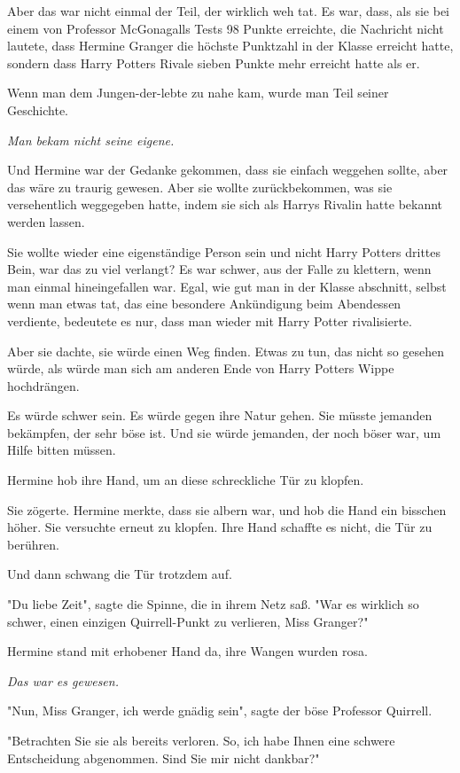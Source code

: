 {Aber das war nicht einmal der Teil, der wirklich weh tat. Es war, dass, als sie bei einem von Professor McGonagalls Tests 98 Punkte erreichte, die Nachricht nicht lautete, dass Hermine Granger die höchste Punktzahl in der Klasse erreicht hatte, sondern dass Harry Potters Rivale sieben Punkte mehr erreicht hatte als er.

Wenn man dem Jungen-der-lebte zu nahe kam, wurde man Teil seiner Geschichte.

\emph{Man bekam nicht seine eigene.}

Und Hermine war der Gedanke gekommen, dass sie einfach weggehen sollte, aber das wäre zu traurig gewesen. Aber sie wollte zurückbekommen, was sie versehentlich weggegeben hatte, indem sie sich als Harrys Rivalin hatte bekannt werden lassen.

Sie wollte wieder eine eigenständige Person sein und nicht Harry Potters drittes Bein, war das zu viel verlangt? Es war schwer, aus der Falle zu klettern, wenn man einmal hineingefallen war. Egal, wie gut man in der Klasse abschnitt, selbst wenn man etwas tat, das eine besondere Ankündigung beim Abendessen verdiente, bedeutete es nur, dass man wieder mit Harry Potter rivalisierte.

Aber sie dachte, sie würde einen Weg finden. Etwas zu tun, das nicht so gesehen würde, als würde man sich am anderen Ende von Harry Potters Wippe hochdrängen.

Es würde schwer sein. Es würde gegen ihre Natur gehen. Sie müsste jemanden bekämpfen, der sehr böse ist. Und sie würde jemanden, der noch böser war, um Hilfe bitten müssen.

Hermine hob ihre Hand, um an diese schreckliche Tür zu klopfen.

Sie zögerte. Hermine merkte, dass sie albern war, und hob die Hand ein bisschen höher. Sie versuchte erneut zu klopfen. Ihre Hand schaffte es nicht, die Tür zu berühren.

Und dann schwang die Tür trotzdem auf.

"Du liebe Zeit", sagte die Spinne, die in ihrem Netz saß. "War es wirklich so schwer, einen einzigen Quirrell-Punkt zu verlieren, Miss Granger?"

Hermine stand mit erhobener Hand da, ihre Wangen wurden rosa.

\emph{Das war es gewesen.}

"Nun, Miss Granger, ich werde gnädig sein", sagte der böse Professor Quirrell.

"Betrachten Sie sie als bereits verloren. So, ich habe Ihnen eine schwere Entscheidung abgenommen. Sind Sie mir nicht dankbar?"

}
